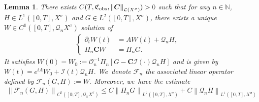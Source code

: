 \documentclass[10pt]{amsart}
\newtheorem{lemma}[theorem]{Lemma}
\theoremstyle{definition}
\let\mc\mathcal
\renewcommand{\O}{\mc{O}}
\newcommand{\N}{\mathbb{N}}
\newcommand{\Q}{\mathcal{Q}}
\newcommand{\bC}{\boldsymbol{C}}
\newcommand\nor[2]{\left\|#1\right\|_{#2}}
\newcommand\FL{\mathcal{F}_{n}}
\begin{document}
\begin{lemma}
\label{lmCauchyobs}
There exists $C(T,\mathfrak{C}_{\textup{obs}},\nor{\bC}{\mc{L}(X^\sigma)})>0$ such that for any $n\in\N$, $H\in L^{1}([0,T],X^{\sigma})$ and $G\in L^{2}([0,T],X^{\sigma})$, there exists a unique $W\in C^{0}([0,T],\Q_{n}X^{\sigma})$ solution of
\begin{align}\label{solprojectlin}
\left\{\begin{array}{rl}
\partial_t W(t)&=AW(t)+\Q_{n}H, \\[3pt]
\Pi_n\bC W &=\Pi_{n}G.
\end{array}\right.
\end{align}
It satisfies $W(0)= W_0:=\O_n^{-1}\Pi_n\left[G-\bC\mc{I}(\cdot)\Q_n H\right]$ and is given by $W(t)=e^{tA}W_{0}+\mc{I}(t)\Q_nH$. We~denote $\FL$ the associated linear operator defined by $\FL(G,H):=W$. Moreover, we~have the estimate
\begin{align}
\label{estimFL}
\nor{\FL(G,H)}{C^{0}([0,T],\Q_{n}X^{\sigma})}\leq C \nor{\Pi_{n}G}{L^{2}([0,T],X^{\sigma})}+C\nor{\Q_{n} H}{L^{1}([0,T],X^{\sigma})}
\end{align}
\end{lemma}
\end{document}

